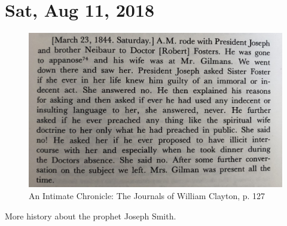 \section{Sat, Aug 11, 2018}

\begin{figure}[h!]
  \centering
  \includegraphics[width=1\linewidth]{2018/images/clayton3.jpg}
  \caption{An Intimate Chronicle: The Journals of William Clayton, p. 127}
  \label{fig:clayton3}
\end{figure}

More history about the prophet Joseph Smith.